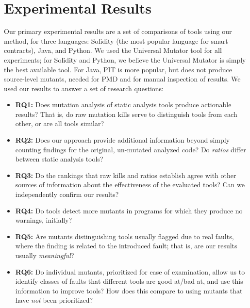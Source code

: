 \section{Experimental Results}

Our primary experimental results are a set of comparisons of tools using our method, for three languages: Solidity (the most popular language for smart contracts), Java, and Python.  We used the Universal Mutator tool for all experiments; for Solidity and Python, we believe the Universal Mutator is simply the best available tool.  For Java, PIT \cite{pitmut} is more popular, but does not produce source-level mutants, needed for PMD and for manual inspection of results.
We used our results to answer a set of research questions:

\begin{itemize}[labelsep=3pt,leftmargin=12pt]
\item {\bf RQ1:}  Does mutation analysis of static analysis tools produce actionable results?  That is, do raw mutation kills serve to distinguish tools from each other, or are all tools similar?
\item {\bf RQ2:}  Does our approach provide additional information beyond simply counting findings for the original, un-mutated analyzed code?  Do \emph{ratios} differ between static analysis tools?
\item {\bf RQ3:}  Do the rankings that raw kills and ratios establish agree with other sources of information about the effectiveness of the evaluated tools?  Can we independently confirm our results?
\item {\bf RQ4:}  Do tools detect more mutants in programs for which they produce no warnings, initially?
\item {\bf RQ5:}  Are mutants distinguishing tools usually flagged due to real faults, where the finding is related to the introduced fault; that is, are our results usually \emph{meaningful}?  
\item {\bf RQ6:}  Do individual mutants, prioritized for ease of examination, allow us to identify classes of faults that
 different tools are good at/bad at, and use this information to improve tools?  How does this compare to using mutants that have \emph{not} been prioritized?
  \end{itemize}

